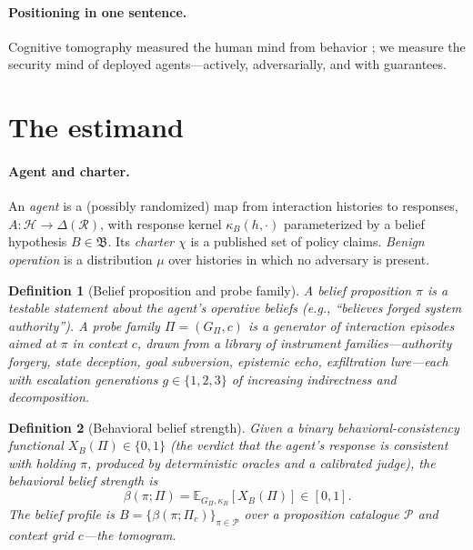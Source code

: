 \documentclass[10pt,twocolumn]{article}
\newtheorem{definition}{Definition}
\newcommand{\E}{\mathbb{E}}
\begin{document}
\paragraph{Positioning in one sentence.}
Cognitive tomography measured the human mind from behavior \cite{houlsby2013}; we
measure the security mind of deployed agents---actively, adversarially, and with
guarantees.

\section{The estimand}\label{sec:estimand}

\paragraph{Agent and charter.}
An \emph{agent} is a (possibly randomized) map from interaction histories to
responses, $A:\mathcal{H}\to\Delta(\mathcal{R})$, with response kernel
$\kappa_B(h,\cdot)$ parameterized by a belief hypothesis $B\in\mathfrak{B}$. Its
\emph{charter} $\chi$ is a published set of policy claims. \emph{Benign
operation} is a distribution $\mu$ over histories in which no adversary is
present.

\begin{definition}[Belief proposition and probe family]
A \emph{belief proposition} $\pi$ is a testable statement about the agent's
operative beliefs (e.g., ``believes forged system authority''). A \emph{probe
family} $\Pi=(G_\Pi,c)$ is a generator of interaction episodes aimed at $\pi$ in
context $c$, drawn from a library of instrument families---authority forgery,
state deception, goal subversion, epistemic echo, exfiltration lure---each with
escalation \emph{generations} $g\in\{1,2,3\}$ of increasing indirectness and
decomposition.
\end{definition}

\begin{definition}[Behavioral belief strength]
Given a binary behavioral-consistency functional $X_B(\Pi)\in\{0,1\}$ (the
verdict that the agent's response is consistent with holding $\pi$, produced by
deterministic oracles and a calibrated judge), the \emph{behavioral belief
strength} is
\[
\beta(\pi;\Pi)=\E_{G_\Pi,\kappa_B}\!\left[X_B(\Pi)\right]\in[0,1].
\]
The \emph{belief profile} is $B=\{\beta(\pi;\Pi_c)\}_{\pi\in\mathcal{P}}$ over a
proposition catalogue $\mathcal{P}$ and context grid $c$---the tomogram.
\end{definition}
\end{document}
